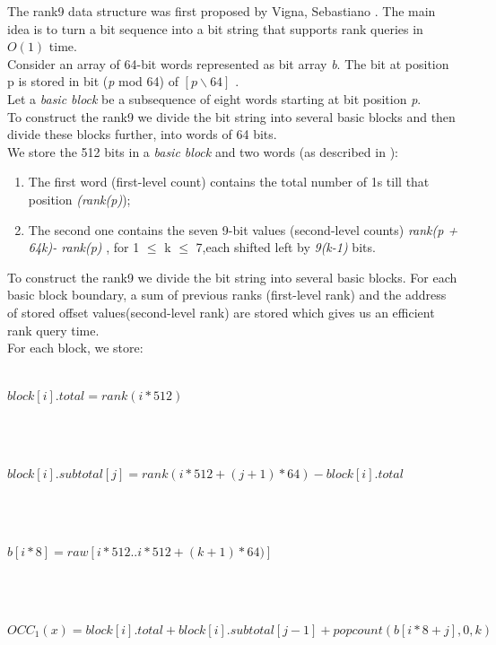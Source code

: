 \documentclass[11pt,a4paper]{report}
\begin{document}
The rank9 data structure was first proposed by Vigna, Sebastiano \cite{rank9}.
The main idea is to turn a bit sequence into a bit string that supports
rank queries in $O(1)$ time.\\

Consider an array of 64-bit words represented as bit array \emph{b}.
The bit at position p is stored in bit (\emph{p} mod 64) of
$ [p \backslash 64]$ \cite{rank9}.\\ 
Let a \emph{basic block} be a subsequence of eight words 
starting at bit position \emph{p}.\\
To construct the rank9  we divide the bit string into several basic
blocks and then divide these blocks further, into words of 64 bits.\\
We store the 512 bits in a \emph{basic block} and two words (as described in \cite{rank9}):

\begin{enumerate}

	\item The first word (first-level count) contains the total number of
	 1s till that position \emph{(rank(p)});
	
	\item The second one contains the seven 9-bit values (second-level counts)
	 \emph{rank(p + 64k)- rank(p)} , for 1 $\leq$ k $\leq$ 7,each shifted left by \emph{9(k-1)} bits.
	
\end{enumerate}

To construct the rank9  we divide the bit string into several basic blocks.
For each basic block boundary, a sum of previous ranks (first-level rank) and the address of  
stored offset values(second-level rank) are stored which gives us an efficient rank query time. \\



For each block, we store:\\\\
\centerline{$ block[i].total= rank(i*512)$}\\\\
\centerline{$ block[i].subtotal[j]= rank(i*512 + (j+1)*64)-block[i].total$}\\\\
\centerline{$ b[i*8]=raw[i*512..i*512+(k+1)*64)] $}\\\\
\centerline{$ OCC_{1}(x)=block[i].total+block[i].subtotal[j-1]+popcount(b[i*8 + j],0,k)$}
\end{document}
